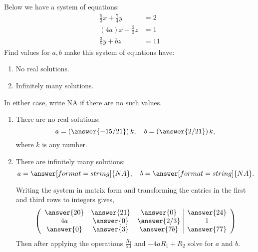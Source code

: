\documentclass{ximera}
\author{Parisa Fatheddin}
\begin{document}
\begin{exercise}
  Below we have a system of equations:
\begin{align*}
\frac{5}{3}x + \frac{7}{4}y &= 2\\
(4a)x + \frac{2}{3}z &= 1\\
\frac{3}{7} y + bz &= 11
\end{align*}
Find values for $a,b$ make this system of equations have:
\begin{enumerate}
\item No real solutions.
\item Infinitely many solutions.
\end{enumerate}
In either case, write NA if there are no such values.
\begin{prompt}
  \begin{enumerate}
  \item  There are no real solutions:
    \[
    a = \left(\answer{-15/21}\right)k,\quad  b= \left(\answer{2/21}\right)k,
    \]
    where $k$ is any number.
  \item There are infinitely many solutions:
    \[
    a = \answer[format=string]{NA},\quad b= \answer[format=string]{NA}.
    \]
\begin{hint}
Writing the system in matrix form and transforming the entries in the first and third rows to integers gives,
\[
\left(\begin{array}{ccc|c}
  \answer{20} &  \answer{21} & \answer{0} &\answer{24} \\
  4a &  \answer{0} & \answer{2/3} & 1\\
  \answer{0} &  \answer{3} & \answer{7b} & \answer{77}
\end{array}\right)
\]
Then after applying the operations $\frac{R_{1}}{20}$ and $-4a R_{1} + R_{2}$ solve for $a$ and $b$.
\end{hint}
  \end{enumerate}
\end{prompt}
\end{exercise}
\end{document}
